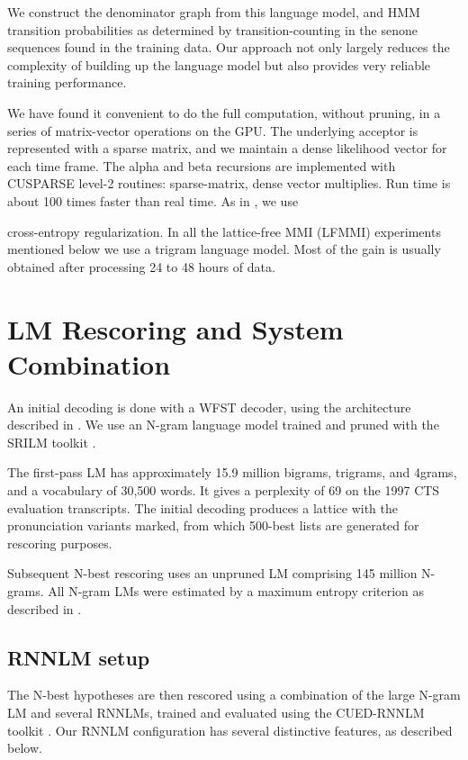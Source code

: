 \documentclass{article}
\begin{document}
We construct the denominator graph from this language model, and HMM transition
probabilities as determined by transition-counting in the 
senone sequences found in the training data. Our approach not only largely reduces 
the complexity of building up the language model but also provides 
very reliable training performance. 

We have found it convenient to do the full computation, without pruning, in a series of matrix-vector
operations on the GPU. The underlying acceptor is represented with a 
sparse matrix, and we maintain a dense likelihood vector for each time
frame. The alpha and beta recursions are implemented with CUSPARSE level-2
routines: sparse-matrix, dense vector multiplies. Run time is about 100 times
faster than real time.
As in \cite{povey2016purely}, we use 


cross-entropy regularization. 
In all the lattice-free MMI (LFMMI) experiments mentioned below we use a trigram language model.
Most of the gain is usually obtained after processing 24 to 48 hours of data.
 
\section{LM Rescoring and System Combination}
\label{sec:rescoring}



An initial decoding is done with a WFST decoder, 
using the architecture described in \cite{mendis2016parallelizing}.
We use an N-gram language model trained and pruned with the SRILM toolkit \cite{stolcke2002srilm}.


The first-pass LM has approximately 15.9 million bigrams, trigrams, and 4grams, and a vocabulary of 30,500 words.
It gives a perplexity of 69 on the 1997 CTS evaluation transcripts.
The initial decoding produces a lattice with the pronunciation variants
marked, from which 500-best lists are generated for rescoring purposes.






Subsequent N-best rescoring uses an unpruned LM comprising 145 million N-grams.
All N-gram LMs were estimated by a maximum entropy criterion as
described in \cite{AlumaeKurimo:interspeech2012}.

\subsection{RNNLM setup}

The N-best hypotheses are then rescored using a combination of the large N-gram LM and several RNNLMs,
trained and evaluated using the CUED-RNNLM toolkit \cite{chen2016cued}.
Our RNNLM configuration has several distinctive features, as described below.
\end{document}
